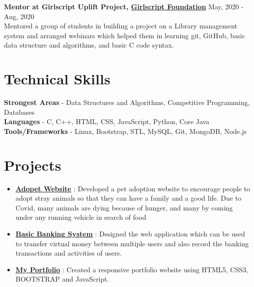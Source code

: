 \documentclass[margin, centered]{res}
\begin{document}
\begin{resume}
\textbf{Mentor at Girlscript Uplift Project, \href{https://drive.google.com/file/d/1-HEx-n0SeThN8SUmXoDLzdNj-KmQgGuv/view?usp=sharing}{Girlscript Foundation}} \hfill May, 2020 - Aug, 2020 \\
  Mentored a group of students in building a project on a Library management system and arranged webinars which helped them in learning git, GitHub, basic data structure and algorithms, and basic C code syntax.   
\section{Technical \hspace{2mm} Skills}
\textbf{Strongest Areas} - Data Structures and Algorithms, Competitive Programming, Databases \\
\textbf{Languages} - C, C++, HTML, CSS, JavaScript, Python, Core Java  \\
\textbf{Tools/Frameworks} - Linux, Bootstrap, STL, MySQL, Git, MongoDB, Node.js

\section{Projects}
\begin{itemize}[leftmargin=*]
  \item \textbf{\href{https://tannuchoudhary.github.io/AdoPet/}{Adopet Website}} : Developed a pet adoption website to encourage people to adopt stray animals so that they can have a family and a good life. Due to Covid, many animals are dying because of hunger, and many by coming under any running vehicle in search of food
 \item \textbf{\href{https://github.com/tannuchoudhary/basic_banking_system}{Basic Banking System}} : Designed the web application which can be used to transfer virtual money between multiple users and also record the banking transactions and activities of users.
  \item \textbf{\href{https://tannuchoudhary.github.io/My-Portfolio/}{My Portfolio}} : Created a responsive portfolio website using HTML5, CSS3, BOOTSTRAP and JavaScript.
  

\end{itemize}
\end{resume}
\end{document}
